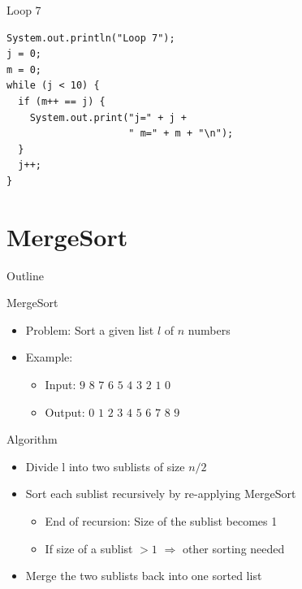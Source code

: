 \begin{frame}[fragile]{Loop 7}
  \begin{lstlisting}
System.out.println("Loop 7");
j = 0;
m = 0;
while (j < 10) {
  if (m++ == j) {
    System.out.print("j=" + j + 
                     " m=" + m + "\n");
  }
  j++;
}
  \end{lstlisting}
\end{frame}


\section{MergeSort}

\begin{frame}{Outline}
  \tableofcontents[current]
\end{frame}

\begin{frame}{MergeSort}
  \begin{itemize}
  \item Problem: Sort a given list $l$ of $n$ numbers
  \item Example:
    \begin{itemize}
    \item Input: $9$ $8$ $7$ $6$ $5$ $4$ $3$ $2$ $1$ $0$
    \item Output: $0$ $1$ $2$ $3$ $4$ $5$ $6$ $7$ $8$ $9$
    \end{itemize}
  \end{itemize}


  \pause

  \begin{exampleblock}{Algorithm}
    \begin{itemize}
    \item Divide l into two sublists of size $n/2$
    \item Sort each sublist recursively by re-applying MergeSort
      \begin{itemize}
      \item End of recursion: Size of the sublist becomes 1
      \item If size of a sublist $> 1$ $\Rightarrow$ other sorting
        needed
      \end{itemize}
    \item Merge the two sublists back into one sorted list
    \end{itemize}
  \end{exampleblock}
\end{frame}

